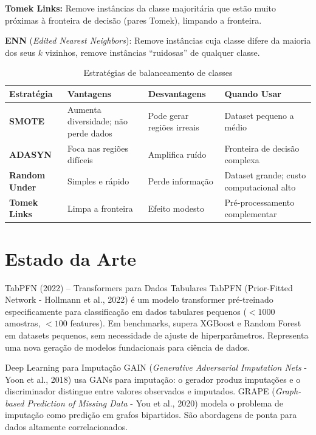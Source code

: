 \documentclass[12pt,a4paper]{article}
\begin{document}
\textbf{Tomek Links:} Remove instâncias da classe majoritária que estão muito próximas à fronteira de decisão (pares Tomek), limpando a fronteira.

\textbf{ENN} (\textit{Edited Nearest Neighbors}): Remove instâncias cuja classe difere da maioria dos seus $k$ vizinhos, remove instâncias ``ruidosas'' de qualquer classe.

\begin{table}[ht]
\centering
\caption{Estratégias de balanceamento de classes}
\label{tab:balanceamento}
\small
\begin{tabular}{>{\bfseries}p{2.8cm} p{3.2cm} p{3.2cm} p{3.0cm}}
\toprule
\textbf{Estratégia} & \textbf{Vantagens} & \textbf{Desvantagens} & \textbf{Quando Usar} \\
\midrule
SMOTE & Aumenta diversidade; não perde dados & Pode gerar regiões irreais & Dataset pequeno a médio \\
\midrule
ADASYN & Foca nas regiões difíceis & Amplifica ruído & Fronteira de decisão complexa \\
\midrule
Random Under & Simples e rápido & Perde informação & Dataset grande; custo computacional alto \\
\midrule
Tomek Links & Limpa a fronteira & Efeito modesto & Pré-processamento complementar \\

\bottomrule
\end{tabular}
\end{table}


\section{Estado da Arte}

\begin{estadoartebox}{TabPFN (2022) -- Transformers para Dados Tabulares}
TabPFN (Prior-Fitted Network - Hollmann et al., 2022) é um modelo transformer pré-treinado especificamente para classificação em dados tabulares pequenos ($< 1000$ amostras, $< 100$ features). Em benchmarks, supera XGBoost e Random Forest em datasets pequenos, sem necessidade de ajuste de hiperparâmetros. Representa uma nova geração de modelos fundacionais para ciência de dados.
\end{estadoartebox}

\begin{estadoartebox}{Deep Learning para Imputação}
GAIN (\textit{Generative Adversarial Imputation Nets} - Yoon et al., 2018) usa GANs para imputação: o gerador produz imputações e o discriminador distingue entre valores observados e imputados. GRAPE (\textit{Graph-based Prediction of Missing Data} - You et al., 2020) modela o problema de imputação como predição em grafos bipartidos. São abordagens de ponta para dados altamente correlacionados.
\end{estadoartebox}
\end{document}
